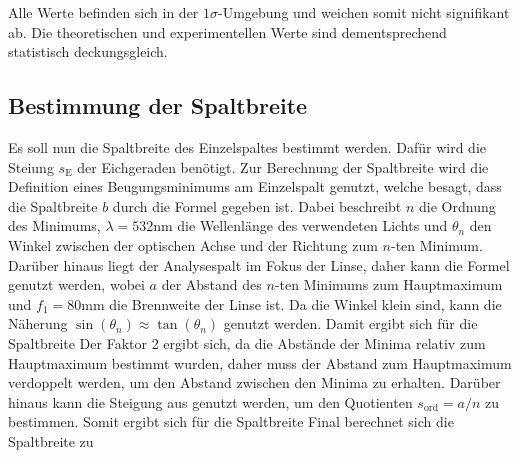 Alle Werte befinden sich in der $1\sigma$-Umgebung und weichen somit nicht signifikant ab. Die theoretischen und experimentellen Werte sind dementsprechend statistisch deckungsgleich.

\subsection{Bestimmung der Spaltbreite}
Es soll nun die Spaltbreite des Einzelspaltes bestimmt werden. Dafür wird die Steiung $s_\text{E}$ der Eichgeraden benötigt. Zur Berechnung der Spaltbreite wird die Definition eines Beugungsminimums am Einzelspalt genutzt, welche besagt, dass die Spaltbreite $b$ durch die Formel
gegeben ist. Dabei beschreibt $n$ die Ordnung des Minimums, $\lambda = 532 \mathrm{nm}$ die Wellenlänge des verwendeten Lichts und $\theta_n$ den Winkel zwischen der optischen Achse und der Richtung zum $n$-ten Minimum. 
Darüber hinaus liegt der Analysespalt im Fokus der Linse, daher kann die Formel
genutzt werden, wobei $a$ der Abstand des $n$-ten Minimums zum Hauptmaximum und $f_1 = 80 \mathrm{mm}$ die Brennweite der Linse ist. Da die Winkel klein sind, kann die Näherung $\sin(\theta_n) \approx \tan(\theta_n)$ genutzt werden. Damit ergibt sich für die Spaltbreite
Der Faktor 2 ergibt sich, da die Abstände der Minima relativ zum Hauptmaximum bestimmt wurden, daher muss der Abstand zum Hauptmaximum verdoppelt werden, um den Abstand zwischen den Minima zu erhalten.
Darüber hinaus kann die Steigung aus  genutzt werden, um den Quotienten $s_\text{ord} = a/n$ zu bestimmen. Somit ergibt sich für die Spaltbreite
Final berechnet sich die Spaltbreite zu

